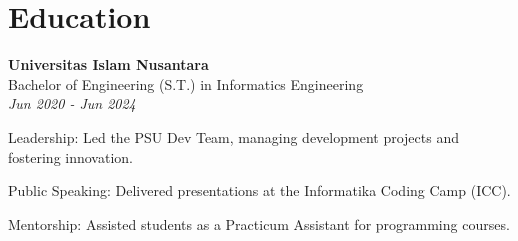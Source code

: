 \section*{Education}
\textbf{Universitas Islam Nusantara} \\
Bachelor of Engineering (S.T.) in Informatics Engineering \\
\textit{Jun 2020 - Jun 2024}
\begin{highlights}
    \item Leadership: Led the PSU Dev Team, managing development projects and fostering innovation.
    \item Public Speaking: Delivered presentations at the Informatika Coding Camp (ICC).
    \item Mentorship: Assisted students as a Practicum Assistant for programming courses.
\end{highlights}
